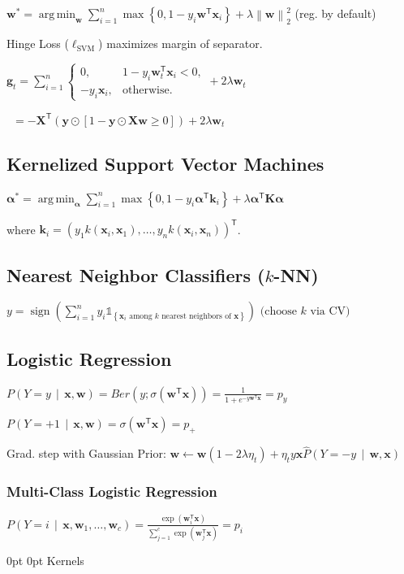 \documentclass[a4paper,8pt,landscape]{extarticle}
\makeatletter
\newcommand{\set}[1]{\left\{ #1 \right\}}
\newcommand{\norm}[1]{\left\lVert #1 \right\rVert}
\newcommand{\cProb}[2]{P\left( #1 \,\middle|\, #2 \right)}
\newcommand{\chProb}[2]{\hat{P}\left( #1 \,\middle|\, #2 \right)}
\newcommand{\ind}[1]{\mathds{1}_{\set{#1}}}
\newcommand*{\T}{\mathsf{T}}
\DeclareMathOperator{\sign}{sign}
\DeclareMathOperator*{\argmin}{arg\,min}
\newcommand{\mat}[1]{\mathbf{#1}}
\renewcommand{\vec}[1]{\mathbf{#1}}
\newcommand{\vg}{\vec{g}}
\newcommand{\vk}{\vec{k}}
\newcommand{\vw}{\vec{w}}
\newcommand{\vx}{\vec{x}}
\newcommand{\vy}{\vec{y}}
\newcommand{\valpha}{\boldsymbol{\alpha}}
\newcommand{\MK}{\mat{K}}
\newcommand{\MX}{\mat{X}}
\newcommand*{\mybox}[1]{%
    \noindent\colorbox{sectionbarcolor}{%
        \parbox{\dimexpr\columnwidth-2\fboxsep\relax}{%
            \textcolor{white}{#1}}}}
\newcommand*{\mybox}[1]{%
    \noindent\colorbox{sectioncolor}{%
        \parbox{\dimexpr\columnwidth-2\fboxsep\relax}{%
            \textcolor{white}{#1}}}}
\renewcommand\section{\@startsection {section}{1}{\z@}%
                                   {0pt}%
                                   {0pt}%
                                   {\normalfont\bfseries\mybox}}
\makeatother
\begin{document}
\begin{multicols*}{3}
$\vw^*=\argmin_{\vw}\sum_{i=1}^n
\max\set{0,1-y_i\vw^\T\vx_i}+\lambda\norm{\vw}_2^2$ (reg. by default)

Hinge Loss ($\ell_{\text{SVM}}$) maximizes margin of separator.

$\vg_t= \sum_{i=1}^n \begin{cases}
0,& 1-y_i\vw_t^\T\vx_i < 0,\\
-y_i\vx_i,& \text{otherwise}.
\end{cases}+2\lambda\vw_t
$

\quad \ $=-\MX^\T\left(\vy\odot\left[1-\vy\odot\MX\vw \geq 0\right]\right)
+2\lambda\vw_t
$

\subsection{Kernelized Support Vector Machines}

$\valpha^*=\argmin_{\valpha} \sum_{i=1}^n \max\set{0,1-y_i\valpha^\T\vk_i}
+\lambda\valpha^\T\MK\valpha
$

where $\vk_i=(y_1k(\vx_i,\vx_1),\ldots,y_nk(\vx_i,\vx_n))^\T$.

\subsection{Nearest Neighbor Classifiers ($k$-NN)}
$
y=\sign\left(\sum_{i=1}^n y_i\ind{\vx_i \text{ among }k\text{ nearest
neighbors of }\vx}\right)
\,\,
\text{(choose }k\text{ via CV)}
$

\subsection{Logistic Regression}

$\cProb{Y=y}{\vx,\vw}=Ber(y;\sigma(\vw^\T\vx))
=\frac{1}{1+e^{-y\vw^\T\vx}}=p_y$

$\cProb{Y=+1}{\vx,\vw}=\sigma(\vw^\T\vx)=p_+$

Grad. step with Gaussian Prior:
$\vw\leftarrow\vw(1-2\lambda\eta_t) + \eta_t
y\vx \chProb{Y=-y}{\vw,\vx}$

\subsubsection{Multi-Class Logistic Regression}

$\cProb{Y=i}{\vx,\vw_1,\ldots,\vw_c}=\frac{\exp(\vw_i^\T\vx)}{
\sum_{j=1}^c \exp(\vw^\T_j\vx)
}=p_i
$

\section{Kernels}


\end{multicols*}
\end{document}
